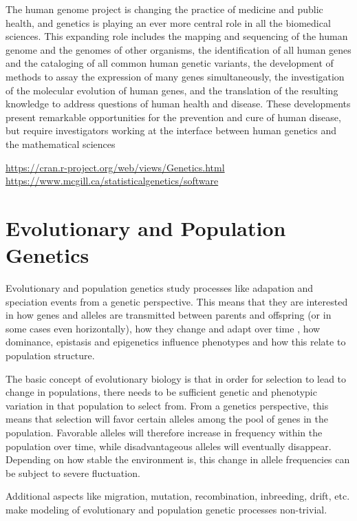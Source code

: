 \documentclass[12pt,]{krantz}
\renewenvironment{quote}{\begin{VF}}{\end{VF}}
\theoremstyle{definition}
\theoremstyle{definition}
\theoremstyle{remark}
\begin{document}
\begin{quote}
The human genome project is changing the practice of medicine and public
health, and genetics is playing an ever more central role in all the
biomedical sciences. This expanding role includes the mapping and
sequencing of the human genome and the genomes of other organisms, the
identification of all human genes and the cataloging of all common human
genetic variants, the development of methods to assay the expression of
many genes simultaneously, the investigation of the molecular evolution
of human genes, and the translation of the resulting knowledge to
address questions of human health and disease. These developments
present remarkable opportunities for the prevention and cure of human
disease, but require investigators working at the interface between
human genetics and the mathematical sciences
\end{quote}

\url{https://cran.r-project.org/web/views/Genetics.html}
\url{https://www.mcgill.ca/statisticalgenetics/software}

\chapter{Evolutionary and Population
Genetics}\label{evolutionary-and-population-genetics}

Evolutionary and population genetics study processes like adapation and
speciation events from a genetic perspective. This means that they are
interested in how genes and alleles are transmitted between parents and
offspring (or in some cases even horizontally), how they change and
adapt over time , how dominance, epistasis and epigenetics influence
phenotypes and how this relate to population structure.

The basic concept of evolutionary biology is that in order for selection
to lead to change in populations, there needs to be sufficient genetic
and phenotypic variation in that population to select from. From a
genetics perspective, this means that selection will favor certain
alleles among the pool of genes in the population. Favorable alleles
will therefore increase in frequency within the population over time,
while disadvantageous alleles will eventually disappear. Depending on
how stable the environment is, this change in allele frequencies can be
subject to severe fluctuation.

Additional aspects like migration, mutation, recombination, inbreeding,
drift, etc. make modeling of evolutionary and population genetic
processes non-trivial.
\end{document}
